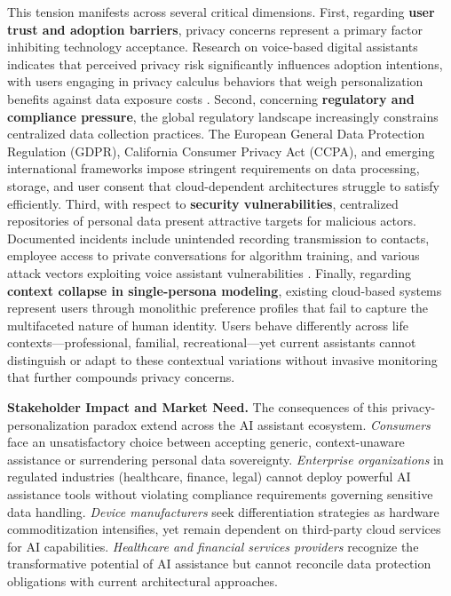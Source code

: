 \documentclass[11pt]{article}
\begin{document}
This tension manifests across several critical dimensions. First, regarding \textbf{user trust and adoption barriers}, privacy concerns represent a primary factor inhibiting technology acceptance. Research on voice-based digital assistants indicates that perceived privacy risk significantly influences adoption intentions, with users engaging in privacy calculus behaviors that weigh personalization benefits against data exposure costs \cite{vimalkumar2021digital}. Second, concerning \textbf{regulatory and compliance pressure}, the global regulatory landscape increasingly constrains centralized data collection practices. The European General Data Protection Regulation (GDPR), California Consumer Privacy Act (CCPA), and emerging international frameworks impose stringent requirements on data processing, storage, and user consent that cloud-dependent architectures struggle to satisfy efficiently. Third, with respect to \textbf{security vulnerabilities}, centralized repositories of personal data present attractive targets for malicious actors. Documented incidents include unintended recording transmission to contacts, employee access to private conversations for algorithm training, and various attack vectors exploiting voice assistant vulnerabilities \cite{edu2021security}. Finally, regarding \textbf{context collapse in single-persona modeling}, existing cloud-based systems represent users through monolithic preference profiles that fail to capture the multifaceted nature of human identity. Users behave differently across life contexts---professional, familial, recreational---yet current assistants cannot distinguish or adapt to these contextual variations without invasive monitoring that further compounds privacy concerns.

\textbf{Stakeholder Impact and Market Need.} The consequences of this privacy-personalization paradox extend across the AI assistant ecosystem. \textit{Consumers} face an unsatisfactory choice between accepting generic, context-unaware assistance or surrendering personal data sovereignty. \textit{Enterprise organizations} in regulated industries (healthcare, finance, legal) cannot deploy powerful AI assistance tools without violating compliance requirements governing sensitive data handling. \textit{Device manufacturers} seek differentiation strategies as hardware commoditization intensifies, yet remain dependent on third-party cloud services for AI capabilities. \textit{Healthcare and financial services providers} recognize the transformative potential of AI assistance but cannot reconcile data protection obligations with current architectural approaches.
\end{document}
